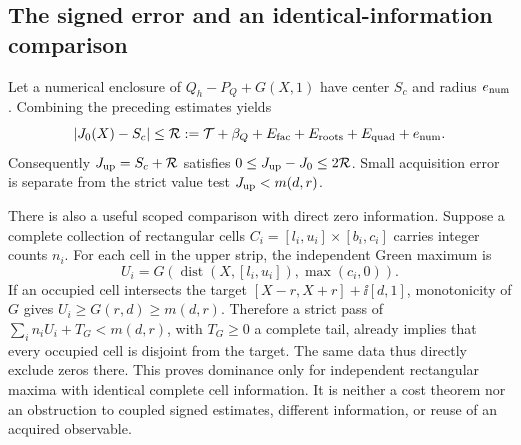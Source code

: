 \subsection{The signed error and an identical-information comparison}
Let a numerical enclosure of \(Q_h-P_Q+G(X,1)\) have center \(S_c\)
and radius \(e_{\rm num}\). Combining the preceding estimates yields
\begin{equation}\label{eq:deflation-ledger}
 |J_0(X)-S_c|\le\mathcal R
 :=\mathcal T+\beta_Q+E_{\rm fac}+E_{\rm roots}+E_{\rm quad}+e_{\rm num}.
\end{equation}
Consequently \(J_{\rm up}=S_c+\mathcal R\) satisfies
\(0\le J_{\rm up}-J_0\le2\mathcal R\). Small acquisition error is
separate from the strict value test \(J_{\rm up}<m(d,r)\).

There is also a useful scoped comparison with direct zero information.
Suppose a complete collection of rectangular cells
\(C_i=[l_i,u_i]\times[b_i,c_i]\) carries integer counts \(n_i\).
For each cell in the upper strip, the independent Green maximum is
\[
 U_i=G(\operatorname{dist}(X,[l_i,u_i]),\max(c_i,0)).
\]
If an occupied cell intersects the target
\([X-r,X+r]+\ii[d,1]\), monotonicity of \(G\) gives
\(U_i\ge G(r,d)\ge m(d,r)\). Therefore a strict pass of
\(\sum_i n_iU_i+T_G<m(d,r)\), with \(T_G\ge0\) a complete tail,
already implies that every occupied cell is disjoint from the target.
The same data thus directly exclude zeros there. This proves dominance
only for independent rectangular maxima with identical complete cell
information. It is neither a cost theorem nor an obstruction to coupled
signed estimates, different information, or reuse of an acquired observable.
